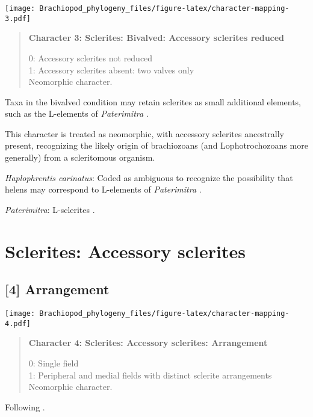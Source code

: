 \documentclass[openany]{book}
\theoremstyle{definition}
\theoremstyle{definition}
\theoremstyle{definition}
\theoremstyle{remark}
\begin{document}
\texttt{[image: Brachiopod\_phylogeny\_files/figure-latex/character-mapping-3.pdf]}

\begin{quote}
\textbf{Character 3: Sclerites: Bivalved: Accessory sclerites reduced}

0: Accessory sclerites not reduced\\
1: Accessory sclerites absent: two valves only\\
Neomorphic character.
\end{quote}

Taxa in the bivalved condition may retain sclerites as small additional
elements, such as the L-elements of \emph{Paterimitra}
\citep{Skovsted2015Theearly}.

This character is treated as neomorphic, with accessory sclerites
ancestrally present, recognizing the likely origin of brachiozoans (and
Lophotrochozoans more generally) from a scleritomous organism.

\hypertarget{Haplophrentis_carinatus-coding-3}{}
\emph{Haplophrentis carinatus}: Coded as ambiguous to recognize the
possibility that helens may correspond to L-elements of
\emph{Paterimitra} \citep{Moysiuk2017Hyolithsare}.

\hypertarget{Paterimitra-coding-3}{}
\emph{Paterimitra}: L-sclerites \citep{Skovsted2009Thescleritome}.

\section{Sclerites: Accessory
sclerites}\label{sclerites-accessory-sclerites}

\subsection*{{[}4{]} Arrangement}\label{arrangement}

\texttt{[image: Brachiopod\_phylogeny\_files/figure-latex/character-mapping-4.pdf]}

\begin{quote}
\textbf{Character 4: Sclerites: Accessory sclerites: Arrangement}

0: Single field\\
1: Peripheral and medial fields with distinct sclerite arrangements\\
Neomorphic character.
\end{quote}

Following \citet{Zhao2017}.
\end{document}
